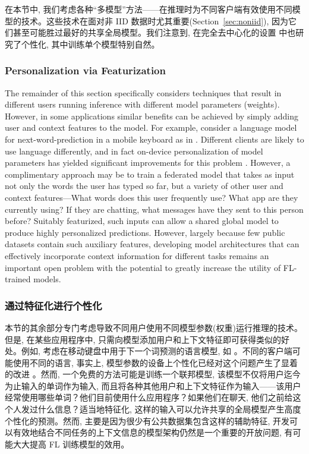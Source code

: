 在本节中, 我们考虑各种“多模型”方法——在推理时为不同客户端有效使用不同模型的技术。这些技术在面对非 IID 数据时尤其重要(Section~\ref{sec:noniid}), 因为它们甚至可能胜过最好的共享全局模型。我们注意到, 在完全去中心化的设置 \citep{Vanhaesebrouck2017,Bellet2018a,Zantedeschi2019,Almeida2018} 中也研究了个性化, 其中训练单个模型特别自然。




\subsubsection{Personalization via Featurization}
The remainder of this section specifically considers techniques that result in different users running inference with different model parameters (weights). However, in some applications similar benefits can be achieved by simply adding user and context features to the model. For example, consider a language model for next-word-prediction in a mobile keyboard as in \citet{hard18gboard}. Different clients are likely to use language differently, and in fact on-device personalization of model parameters has yielded significant improvements for this problem \citep{wang2019federated}. However, a complimentary approach may be to train a federated model that takes as input not only the words the user has typed so far, but a variety of other user and context features---What words does this user frequently use? What app are they currently using? If they are chatting, what messages have they sent to this person before? Suitably featurized, such inputs can allow a shared global model to produce highly personalized predictions. However, largely because few public datasets contain such auxiliary features, developing model architectures that can effectively incorporate context information for different tasks remains an important open problem with the potential to greatly increase the utility of FL-trained models.  

\subsubsection*{通过特征化进行个性化}
本节的其余部分专门考虑导致不同用户使用不同模型参数(权重)运行推理的技术。但是, 在某些应用程序中, 只需向模型添加用户和上下文特征即可获得类似的好处。例如, 考虑在移动键盘中用于下一个词预测的语言模型, 如 \citet{hard18gboard}。不同的客户端可能使用不同的语言, 事实上, 模型参数的设备上个性化已经对这个问题产生了显着的改进 \citep{wang2019federated}。然而, 一个免费的方法可能是训练一个联邦模型, 该模型不仅将用户迄今为止输入的单词作为输入, 而且将各种其他用户和上下文特征作为输入——该用户经常使用哪些单词？他们目前使用什么应用程序？如果他们在聊天, 他们之前给这个人发过什么信息？适当地特征化, 这样的输入可以允许共享的全局模型产生高度个性化的预测。然而, 主要是因为很少有公共数据集包含这样的辅助特征, 开发可以有效地结合不同任务的上下文信息的模型架构仍然是一个重要的开放问题, 有可能大大提高 FL 训练模型的效用。


